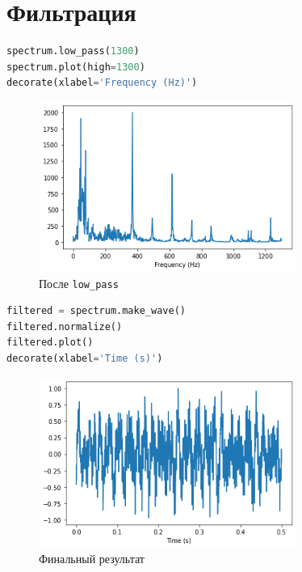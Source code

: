 \documentclass[a4paper,12pt]{report}
\begin{document}
    \section{Фильтрация}
    
\begin{lstlisting}[language=Python,caption=Делаем \texttt{low\_pass}]
spectrum.low_pass(1300)
spectrum.plot(high=1300)
decorate(xlabel='Frequency (Hz)')
\end{lstlisting}

    \begin{figure}[H]
        \centering
        \includegraphics[width=0.75\textwidth]{ex2_low_pass.png}
        \caption{После \texttt{low\_pass}}
        \label{fig:ex2_low_pass}
    \end{figure}
    
\begin{lstlisting}[language=Python,caption=Финальный результат]
filtered = spectrum.make_wave()
filtered.normalize()
filtered.plot()
decorate(xlabel='Time (s)')
\end{lstlisting}

    \begin{figure}[H]
        \centering
        \includegraphics[width=0.75\textwidth]{ex2_final_filtered.png}
        \caption{Финальный результат}
        \label{fig:ex2_final_filtered}
    \end{figure}
\end{document}
